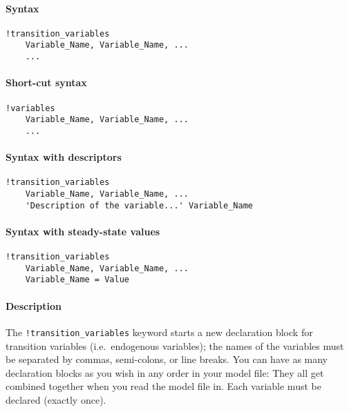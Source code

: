 


	\paragraph{Syntax}\label{syntax}

\begin{verbatim}
!transition_variables
    Variable_Name, Variable_Name, ...
    ...
\end{verbatim}

\paragraph{Short-cut syntax}\label{short-cut-syntax}

\begin{verbatim}
!variables
    Variable_Name, Variable_Name, ...
    ...
\end{verbatim}

\paragraph{Syntax with descriptors}\label{syntax-with-descriptors}

\begin{verbatim}
!transition_variables
    Variable_Name, Variable_Name, ...
    'Description of the variable...' Variable_Name
\end{verbatim}

\paragraph{Syntax with steady-state
values}\label{syntax-with-steady-state-values}

\begin{verbatim}
!transition_variables
    Variable_Name, Variable_Name, ...
    Variable_Name = Value
\end{verbatim}

\paragraph{Description}\label{description}

The \texttt{!transition\_variables} keyword starts a new declaration
block for transition variables (i.e.~endogenous variables); the names of
the variables must be separated by commas, semi-colons, or line breaks.
You can have as many declaration blocks as you wish in any order in your
model file: They all get combined together when you read the model file
in. Each variable must be declared (exactly once).

